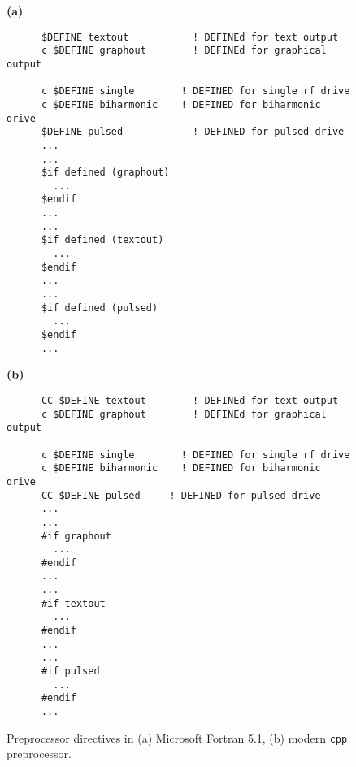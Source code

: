 \begin{supplement}
\begin{figure}[p]
\begin{minipage}{\textwidth}
\textbf{(a)}
\begin{lstlisting}
      $DEFINE textout			! DEFINEd for text output
      c $DEFINE graphout		! DEFINEd for graphical output
      
      c $DEFINE single        ! DEFINED for single rf drive
      c $DEFINE biharmonic    ! DEFINED for biharmonic drive
      $DEFINE pulsed			! DEFINED for pulsed drive
      ...
      ...
      $if defined (graphout)
      	...
      $endif
      ...
      ...
      $if defined (textout)
      	...
      $endif
      ...
      ...
      $if defined (pulsed)
      	...
      $endif
      ...

\end{lstlisting}
\end{minipage}
%
\hfill
%
\begin{minipage}{\textwidth}
\textbf{(b)}
\begin{lstlisting}
      CC $DEFINE textout		! DEFINEd for text output
      c $DEFINE graphout		! DEFINEd for graphical output
      
      c $DEFINE single        ! DEFINED for single rf drive
      c $DEFINE biharmonic    ! DEFINED for biharmonic drive
      CC $DEFINE pulsed		! DEFINED for pulsed drive
      ...
      ...
      #if graphout
      	...
      #endif
      ...
      ...
      #if textout
      	...
      #endif
      ...
      ...
      #if pulsed
      	...
      #endif
      ...

\end{lstlisting}
\end{minipage}

\caption{Preprocessor directives in (a) Microsoft Fortran 5.1, (b) modern \texttt{cpp} preprocessor.}
\label{fig:preprocessor}
\end{figure}




\begin{figure}[p]
\centering


\end{figure}
\end{supplement}
